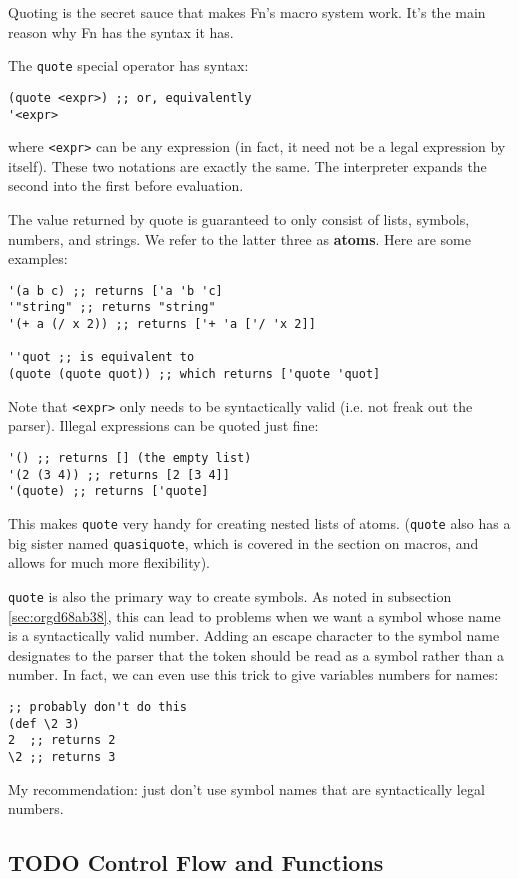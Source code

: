 \documentclass[11pt]{article}
\begin{document}
Quoting is the secret sauce that makes Fn's macro system work. It's the main
reason why Fn has the syntax it has.

The \texttt{quote} special operator has syntax:
\begin{verbatim}
(quote <expr>) ;; or, equivalently
'<expr>
\end{verbatim}
where \texttt{<expr>} can be any expression (in fact, it need not be a legal expression
by itself). These two notations are exactly the same. The interpreter expands
the second into the first before evaluation.

The value returned by quote is guaranteed to only consist of lists, symbols,
numbers, and strings. We refer to the latter three as \textbf{atoms}. Here are some
examples:
\begin{verbatim}
'(a b c) ;; returns ['a 'b 'c]
'"string" ;; returns "string"
'(+ a (/ x 2)) ;; returns ['+ 'a ['/ 'x 2]]

''quot ;; is equivalent to
(quote (quote quot)) ;; which returns ['quote 'quot]
\end{verbatim}

Note that \texttt{<expr>} only needs to be syntactically valid (i.e. not freak out the
parser). Illegal expressions can be quoted just fine:
\begin{verbatim}
'() ;; returns [] (the empty list)
'(2 (3 4)) ;; returns [2 [3 4]]
'(quote) ;; returns ['quote]
\end{verbatim}

This makes \texttt{quote} very handy for creating nested lists of atoms. (\texttt{quote} also has
a big sister named \texttt{quasiquote}, which is covered in the section on macros, and
allows for much more flexibility).

\texttt{quote} is also the primary way to create symbols. As noted in subsection \ref{sec:orgd68ab38}, this can lead to problems when we want a symbol whose name is a
syntactically valid number. Adding an escape character to the symbol name
designates to the parser that the token should be read as a symbol rather than a
number. In fact, we can even use this trick to give variables numbers for names:
\begin{verbatim}
;; probably don't do this
(def \2 3)
2  ;; returns 2
\2 ;; returns 3
\end{verbatim}

My recommendation: just don't use symbol names that are syntactically legal
numbers.


\subsection{{\bfseries\sffamily TODO} Control Flow and Functions}
\label{sec:org679c46d}
\end{document}
